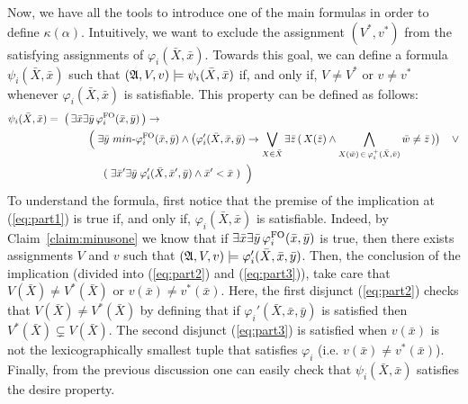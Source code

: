 Now, we have all the tools to introduce one of the main formulas in order to define $\kappa(\alpha)$. 
Intuitively, we want to exclude the assignment $(V^*, v^*)$ from the satisfying assignments of $\varphi_i(\bar{X},\bar{x})$.
Towards this goal, we can define a formula $\psi_i(\bar{X},\bar{x})$ such that $(\mathfrak{A}, V, v) \models \psi_i(\bar{X},\bar{x})$ if, and only if, 
$V \neq V^*$ or $v \neq v^*$ whenever $\varphi_i(\bar{X}, \bar{x})$ is satisfiable. 
This property can be defined as follows:
\begin{align}
\psi_i(\bar{X},\bar{x}) = & \;\; \big( \, \exists\bar{x}\exists\bar{y}\, \varphi^{\fo}_i(\bar{x},\bar{y}) \,\big) \rightarrow  \label{eq:part1} \\
& \hspace{1cm} \Big( \; 
\exists\bar{y}~\text{$min$-}\varphi^{\fo}_i(\bar{x}, \bar{y}) \wedge \big( \varphi_i'(\bar{X},\bar{x}, \bar{y})  \rightarrow \bigvee_{X \in \bar{X}} \exists\bar{z}\, ( \, X(\bar{z}) \wedge \bigwedge\limits_{X(\bar{w}) \, \in \, \varphi^{+}_i(\bar{X},\bar{v})}\bar{w}\neq\bar{z} \, ) \big)  \;\;\;\;  \vee   \label{eq:part2} \\ 
& \hspace{1.5cm} (\; \exists\bar{x}'\exists\bar{y}\; \varphi_i'(\bar{X},\bar{x}',\bar{y})\wedge \bar{x}' < \bar{x} \; ) \;\; \Big)  \label{eq:part3}
\end{align}
To understand the formula, first notice that the premise of the implication at (\ref{eq:part1}) is true if, and only if, $\varphi_i(\bar{X}, \bar{x})$ is satisfiable. 
Indeed, by Claim~\ref{claim:minusone} we know that if $\exists\bar{x}\exists\bar{y}\, \varphi^{{\rm FO}}_i(\bar{x},\bar{y})$ is true, then there exists assignments $V$ and $v$ such that $(\mathfrak{A},V,v) \models\varphi_i'(\bar{X},\bar{x},\bar{y})$.
Then, the conclusion of the implication (divided into (\ref{eq:part2}) and (\ref{eq:part3})), take care that $V(\bar{X}) \neq V^*(\bar{X})$ or $v(\bar{x}) \neq v^*(\bar{x})$.
Here, the first disjunct (\ref{eq:part2}) checks that $V(\bar{X}) \neq V^*(\bar{X})$ by defining that if $\varphi_i'(\bar{X},\bar{x}, \bar{y})$ is satisfied then $V^*(\bar{X}) \subsetneq V(\bar{X})$. 
The second disjunct (\ref{eq:part3}) is satisfied when $v(\bar{x})$ is not the lexicographically smallest tuple that satisfies $\varphi_i$ (i.e. $v(\bar{x}) \neq v^*(\bar{x})$).
Finally, from the previous discussion one can easily check that $\psi_i(\bar{X},\bar{x})$ satisfies the desire property.

